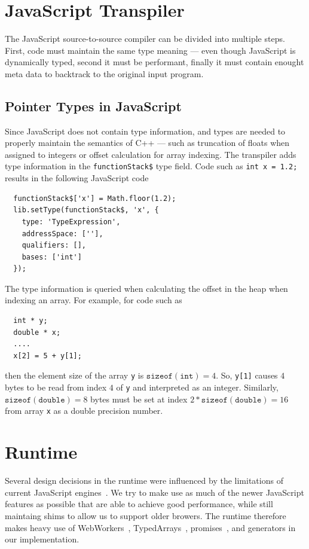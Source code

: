 \documentclass[nocopyrightspace]{sigchi}
\begin{document}
\section{JavaScript Transpiler}

The JavaScript source-to-source compiler can be divided into multiple steps.
First, code must maintain the same type meaning --- even though JavaScript 
is dynamically typed, second it must be performant, finally it must contain
enought meta data to backtrack to the original input program.

\subsection{Pointer Types in JavaScript}

Since JavaScript does not contain type information, and types are needed to
properly maintain the semantics of C++ --- such as truncation of floats when
assigned to integers or offset calculation for array indexing. The transpiler
adds type information in the {\tt functionStack\$} type field. Code such as
{\tt int x = 1.2;} results in the following JavaScript code

\begin{verbatim}
  functionStack$['x'] = Math.floor(1.2);
  lib.setType(functionStack$, 'x', {
    type: 'TypeExpression',
    addressSpace: [''],
    qualifiers: [],
    bases: ['int']
  });
\end{verbatim}

The type information is queried when calculating the offset in the heap when
indexing an array. For example, for code such as

\begin{verbatim}
  int * y;
  double * x;
  ....
  x[2] = 5 + y[1];
\end{verbatim}

then the element size of the array {\tt y} is $\mathtt{sizeof(int)} = 4$.
So, {\tt y[1]} causes $4$ bytes to be read from index $4$ of {\tt y} and
interpreted as an integer. Similarly, $\mathtt{sizeof(double)} = 8$ bytes
must be set at index $2 * \mathtt{sizeof(double)} = 16$ from array {\tt x}
as a double precision number.


\section{Runtime}

Several design decisions in the runtime were influenced by the limitations
of current JavaScript engines~\cite{vilk2014doppio,vouillon2013bytecode,zakai2011emscripten}.
We try to make use as much of the newer JavaScript features as possible that are
able to achieve good performance, while still maintaing shims to allow us
to support older browers. The runtime therefore makes heavy use of WebWorkers~\cite{green2012web}, 
TypedArrays~\cite{matsakistyped, grimmer2014efficient}, promises~\cite{kambona2013evaluation,bonetta2013tigerquoll},
and generators in our implementation. 
\end{document}
